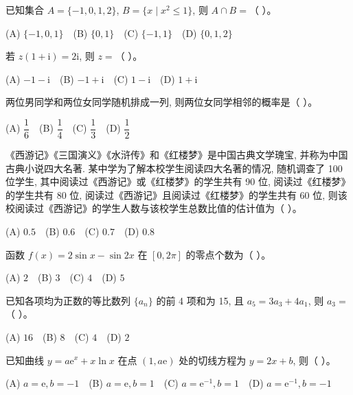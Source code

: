 \begin{question}
已知集合 $A = \{-1, 0, 1, 2\}$, $B = \{x \mid x^2 \leqslant 1\}$, 则 $A \cap B =$（ ）。

(A) $\{-1, 0, 1\}$　(B) $\{0, 1\}$　(C) $\{-1, 1\}$　(D) $\{0, 1, 2\}$

\end{question}
\begin{question}
若 $z(1 + \mathrm{i}) = 2\mathrm{i}$, 则 $z =$（ ）。

(A) $-1 - \mathrm{i}$　(B) $-1 + \mathrm{i}$　(C) $1 - \mathrm{i}$　(D) $1 + \mathrm{i}$

\end{question}
\begin{question}
两位男同学和两位女同学随机排成一列, 则两位女同学相邻的概率是（ ）。

(A) $\dfrac{1}{6}$　(B) $\dfrac{1}{4}$　(C) $\dfrac{1}{3}$　(D) $\dfrac{1}{2}$

\end{question}
\begin{question}
《西游记》《三国演义》《水浒传》和《红楼梦》是中国古典文学瑰宝, 并称为中国古典小说四大名著. 某中学为了解本校学生阅读四大名著的情况, 随机调查了 100 位学生, 其中阅读过《西游记》或《红楼梦》的学生共有 90 位, 阅读过《红楼梦》的学生共有 80 位, 阅读过《西游记》且阅读过《红楼梦》的学生共有 60 位, 则该校阅读过《西游记》的学生人数与该校学生总数比值的估计值为（ ）。

(A) $0.5$　(B) $0.6$　(C) $0.7$　(D) $0.8$

\end{question}
\begin{question}
函数 $f(x) = 2\sin x - \sin 2x$ 在 $[0, 2\pi]$ 的零点个数为（ ）。

(A) $2$　(B) $3$　(C) $4$　(D) $5$

\end{question}
\begin{question}
已知各项均为正数的等比数列 $\{a_n\}$ 的前 4 项和为 15, 且 $a_5 = 3a_3 + 4a_1$, 则 $a_3 =$（ ）。

(A) $16$　(B) $8$　(C) $4$　(D) $2$

\end{question}
\begin{question}
已知曲线 $y = a\mathrm{e}^x + x\ln x$ 在点 $(1, a\mathrm{e})$ 处的切线方程为 $y = 2x + b$, 则（ ）。

(A) $a = \mathrm{e}, b = -1$　(B) $a = \mathrm{e}, b = 1$　(C) $a = \mathrm{e}^{-1}, b = 1$　(D) $a = \mathrm{e}^{-1}, b = -1$

\Needspace{0.4\textheight}
\end{question}
